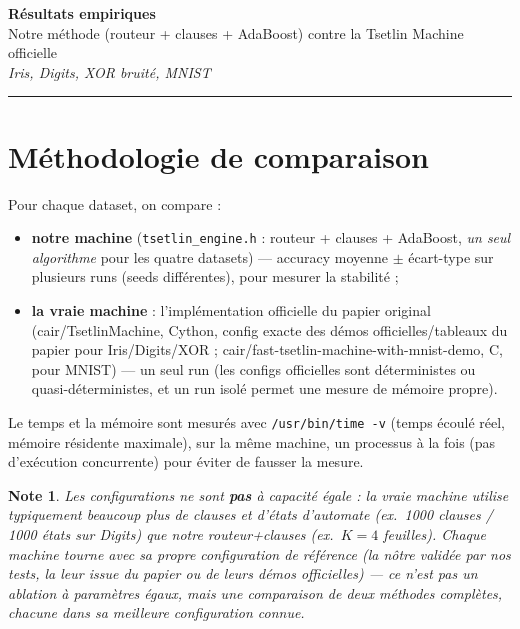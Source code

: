 \documentclass[12pt,a4paper]{article}
\newcommand{\code}[1]{\texttt{#1}}
\theoremstyle{plain}
\newtheorem{note}{Note}[section]
\begin{document}

\begin{center}
  {\LARGE\bfseries R\'esultats empiriques}\\[6pt]
  {\large Notre m\'ethode (routeur + clauses + AdaBoost) contre la Tsetlin Machine officielle}\\[4pt]
  {\large\itshape Iris, Digits, XOR bruit\'e, MNIST}
\end{center}

\vspace{1em}
\hrule
\vspace{1.5em}

\tableofcontents

\newpage

\section{M\'ethodologie de comparaison}

Pour chaque dataset, on compare :
\begin{itemize}
  \item \textbf{notre machine} (\code{tsetlin\_engine.h} : routeur + clauses + AdaBoost, \emph{un seul algorithme} pour les quatre datasets) --- accuracy moyenne $\pm$ \'ecart-type sur plusieurs runs (seeds diff\'erentes), pour mesurer la stabilit\'e ;
  \item \textbf{la vraie machine} : l'impl\'ementation officielle du papier original (cair/TsetlinMachine, Cython, config exacte des d\'emos officielles/tableaux du papier pour Iris/Digits/XOR ; cair/fast-tsetlin-machine-with-mnist-demo, C, pour MNIST) --- un seul run (les configs officielles sont d\'eterministes ou quasi-d\'eterministes, et un run isol\'e permet une mesure de m\'emoire propre).
\end{itemize}

Le temps et la m\'emoire sont mesur\'es avec \code{/usr/bin/time -v} (temps \'ecoul\'e r\'eel, m\'emoire r\'esidente maximale), sur la m\^eme machine, un processus \`a la fois (pas d'ex\'ecution concurrente) pour \'eviter de fausser la mesure.

\begin{note}
Les configurations ne sont \textbf{pas} \`a capacit\'e \'egale : la vraie machine utilise typiquement beaucoup plus de clauses et d'\'etats d'automate (ex.\ 1000 clauses / 1000 \'etats sur Digits) que notre routeur+clauses (ex.\ $K{=}4$ feuilles). Chaque machine tourne avec \emph{sa propre} configuration de r\'ef\'erence (la n\^otre valid\'ee par nos tests, la leur issue du papier ou de leurs d\'emos officielles) --- ce n'est pas un ablation \`a param\`etres \'egaux, mais une comparaison de deux m\'ethodes compl\`etes, chacune dans sa meilleure configuration connue.
\end{note}
\end{document}
